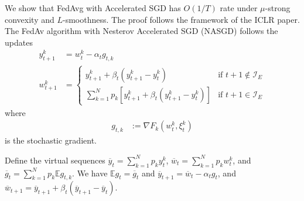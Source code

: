 We show that FedAvg with Accelerated SGD has $O(1/T)$ rate under
$\mu$-strong convexity and $L$-smoothness. The proof follows the
framework of the ICLR paper. The FedAv algorithm with Nesterov Accelerated
SGD (NASGD) follows the updates
\begin{align*}
y_{t+1}^{k} & =w_{t}^{k}-\alpha_{t}g_{t,k}\\
w_{t+1}^{k} & =\begin{cases}
y_{t+1}^{k}+\beta_{t}(y_{t+1}^{k}-y_{t}^{k}) & \text{if }t+1\notin\mathcal{I}_{E}\\
\sum_{k=1}^{N}p_{k}\left[y_{t+1}^{k}+\beta_{t}(y_{t+1}^{k}-y_{t}^{k})\right] & \text{if }t+1\in\mathcal{I}_{E}
\end{cases}
\end{align*}
where 
\begin{align*}
g_{t,k} & :=\nabla F_{k}(w_{t}^{k},\xi_{t}^{k})
\end{align*}
is the stochastic gradient. 

Define the virtual sequences $\overline{y}_{t}=\sum_{k=1}^{N}p_{k}y_{t}^{k}$,
$\overline{w}_{t}=\sum_{k=1}^{N}p_{k}w_{t}^{k}$, and $\overline{g}_{t}=\sum_{k=1}^{N}p_{k}\mathbb{E}g_{t,k}$.
We have $\mathbb{E}g_{t}=\overline{g}_{t}$ and $\overline{y}_{t+1}=\overline{w}_{t}-\alpha_{t}g_{t}$,
and $\overline{w}_{t+1}=\overline{y}_{t+1}+\beta_{t}(\overline{y}_{t+1}-\overline{y}_{t})$. 

